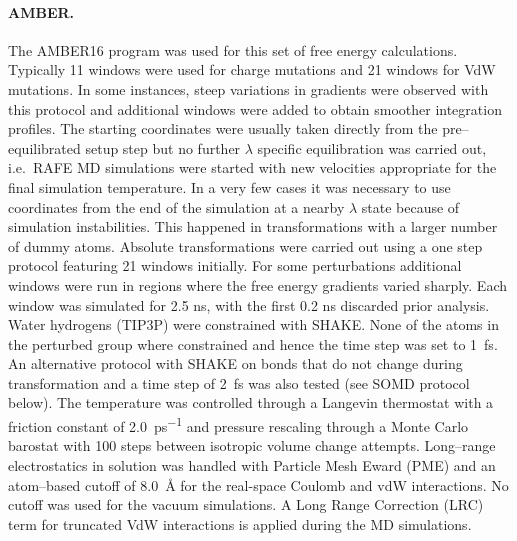 \documentclass[journal=jctcce,manuscript=article]{achemso}
\begin{document}
\paragraph{AMBER.}
The AMBER16 program was used for this set of free energy calculations.
%
Typically 11 windows were used for charge mutations and 21 windows for VdW mutations.
In some instances, steep variations in gradients were observed with this protocol and additional windows were added to obtain smoother integration profiles.
The starting coordinates were usually taken directly from the pre--equilibrated setup step but no further $\lambda$ specific equilibration  was carried out,
i.e.\ RAFE MD simulations were started with new velocities appropriate for the final simulation temperature.
In a very few cases it was necessary to use coordinates from the end of the simulation at a nearby $\lambda$ state because of simulation instabilities.
This happened in transformations with a larger number of dummy atoms.
Absolute transformations were carried out using a one step protocol featuring 21 windows initially.
For some perturbations additional windows were run in regions where the free energy gradients varied sharply.
Each window was simulated for 2.5 ns, with the first 0.2 ns discarded prior analysis.
%
Water hydrogens (TIP3P) were constrained with SHAKE.
None of the atoms in the perturbed group where constrained and hence the time step was set to \SI{1}{fs}.
An alternative protocol with SHAKE on bonds that do not change during transformation and a time step of \SI{2}{fs} was also tested (see SOMD protocol below).
%
The temperature was controlled through a Langevin thermostat with a friction constant of \SI{2.0}{ps^{-1}} and pressure
rescaling through a Monte Carlo barostat with 100 steps between isotropic volume change attempts.
%
Long--range electrostatics in solution was handled with Particle Mesh Eward (PME) and an atom--based cutoff
of \SI{8.0}{\angstrom} for the real-space Coulomb and vdW interactions.
No cutoff was used for the vacuum simulations.
%
A Long Range Correction (LRC) term for truncated VdW interactions is applied during the MD simulations.
%
\end{document}
